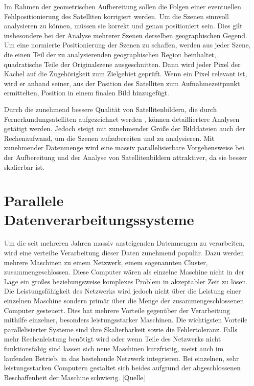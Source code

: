 Im Rahmen der geometrischen Aufbereitung sollen die Folgen einer eventuellen Fehlpositionierung des Satelliten korrigiert werden. Um die Szenen sinnvoll analysieren zu können, müssen sie korrekt und genau positioniert sein. Dies gilt insbesondere bei der Analyse mehrerer Szenen derselben geographischen Gegend. Um eine normierte Positionierung der Szenen zu schaffen, werden aus jeder Szene, die einen Teil der zu analysierenden geographischen Region beinhaltet, quadratische Teile der Originalszene ausgeschnitten. Dann wird jeder Pixel der Kachel auf die Zugehörigkeit zum Zielgebiet geprüft. Wenn ein Pixel relevant ist, wird er anhand seiner, aus der Position des Satelliten zum Aufnahmezeitpunkt ermittelten, Position in einem finalen Bild hinzugefügt. 


 
Durch die zunehmend bessere Qualität von Satellitenbildern, die durch Fernerkundungsatelliten aufgezeichnet werden \cite{Markham2004}, können detailliertere Analysen getätigt werden. Jedoch steigt mit zunehmender Größe der Bilddateien auch der Rechenaufwand, um die Szenen aufzubereiten und zu analysieren. Mit zunehmender Datenmenge wird eine massiv parallelisierbare Vorgehensweise bei der Aufbereitung und der Analyse von Satellitenbildern attraktiver, da sie besser skalierbar ist.


\section{Parallele Datenverarbeitungssysteme}
Um die seit mehreren Jahren massiv ansteigenden Datenmengen \cite{EMC2014} zu verarbeiten, wird eine verteilte Verarbeitung dieser Daten zunehmend populär. Dazu werden mehrere Maschinen zu einem Netzwerk, einem sogenannten Cluster, zusammengeschlossen. Diese Computer wären als einzelne Maschine nicht in der Lage ein großes beziehungsweise komplexes Problem in akzeptabler Zeit zu lösen. Die Leistungsfähigkeit des Netzwerks wird jedoch nicht über die Leistung einer einzelnen Maschine sondern primär über die Menge der zusammengeschlossenen Computer gesteuert. Dies hat mehrere Vorteile gegenüber der Verarbeitung mithilfe einzelner, besonders leistungsstarker Maschinen. Die wichtigsten Vorteile parallelisierter Systeme sind ihre Skalierbarkeit sowie die Fehlertoleranz. Falls mehr Rechenleistung benötigt wird oder wenn Teile des Netzwerks nicht funktionsfähig sind lassen sich neue Maschinen kurzfristig, meist auch im laufenden Betrieb, in das bestehende Netzwerk integrieren. Bei einzelnen, sehr leistungsstarken Computern gestaltet sich beides aufgrund der abgeschlossenen Beschaffenheit der Maschine schwierig. [Quelle]

